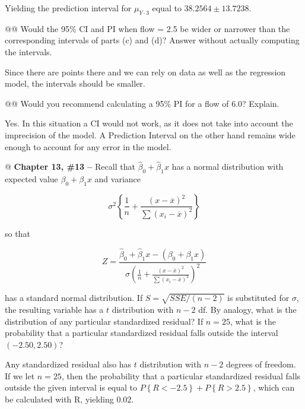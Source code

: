 \documentclass[10pt]{article}\usepackage[]{graphicx}\usepackage[]{xcolor}
\begin{document}
\begin{easylist}[enumerate]
    Yielding the prediction interval for $\mu_{Y \cdot 3}$ equal to $38.2564 \pm 13.7238$.

    @@ Would the 95\% CI and PI when flow = 2.5 be wider or narrower than the corresponding intervals of parts (c) and
    (d)? Answer without actually computing the intervals.\newline

    Since there are points there and we can rely on data as well as the regression model, the intervals should be
    smaller.

    @@ Would you recommend calculating a 95\% PI for a flow of 6.0? Explain.\newline

    Yes. In this situation a CI would not work, as it does not take into account the imprecision of the model. A
    Prediction Interval on the other hand remains wide enough to account for any error in the model.

    @ \textbf{Chapter 13, \#13 --} Recall that $\hat{\beta}_0 + \hat{\beta}_1 x$ has a normal distribution with expected
    value $\beta_0 + \beta_1 x$ and variance

    \begin{equation}
        \sigma^2 \left\{ \frac{1}{n} + \frac{ {\left( x - \overline{x} \right)}^2}
                 {\sum { \left( x_i - \overline{x} \right)}^2} \right\}
    \end{equation}

    so that

    \begin{equation}
        Z = \frac{\hat{\beta}_0 + \hat{\beta}_1 x - \left( \beta_0 + \beta_1 x \right)}
        {\sigma { \left( \frac{1}{n} + \frac{{\left( x - \overline{x} \right)}^2}
                        {\sum { \left( x_i - \overline{x} \right)}^2} \right) }^2}
    \end{equation}

    has a standard normal distribution. If $S = \sqrt{SSE/(n-2)}$ is substituted for $\sigma$, the resulting
    variable has a $t$ distribution with $n - 2$ df. By analogy, what is the distribution of any particular standardized
    residual? If $n = 25$, what is the probability that a particular standardized residual falls outside the interval
    $(-2.50, 2.50)$?\newline

    Any standardized residual also has $t$ distribution with $n - 2$ degrees of freedom. If we let $n=25$, then the
    probability that a particular standardized residual falls outside the given interval is equal to
    $P\left\{ R < -2.5 \right\} + P\left\{ R > 2.5 \right\}$, which can be calculated with R, yielding
    $0.02$.
\end{easylist}

\newpage
\end{document}
